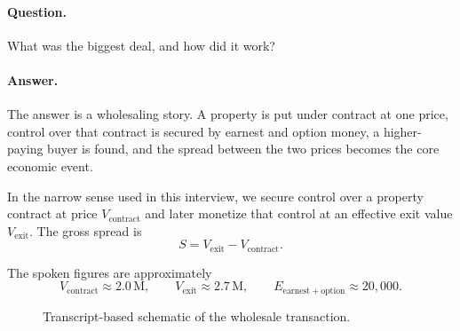 \paragraph{Question.}
What was the biggest deal, and how did it work?

\paragraph{Answer.}
The answer is a wholesaling story. A property is put under contract at one price, control over that contract is secured by earnest and option money, a higher-paying buyer is found, and the spread between the two prices becomes the core economic event.

\begin{definition}
In the narrow sense used in this interview, we secure control over a property contract at price \(V_{\mathrm{contract}}\) and later monetize that control at an effective exit value \(V_{\mathrm{exit}}\). The gross spread is
\begin{equation}
S = V_{\mathrm{exit}} - V_{\mathrm{contract}}.
\end{equation}
\end{definition}

The spoken figures are approximately
\begin{equation}
V_{\mathrm{contract}} \approx 2.0\,\mathrm{M},
\qquad
V_{\mathrm{exit}} \approx 2.7\,\mathrm{M},
\qquad
E_{\mathrm{earnest+option}} \approx 20{,}000.
\end{equation}

\begin{figure}[h]
\centering
{}
\caption{Transcript-based schematic of the wholesale transaction.}
\end{figure}

